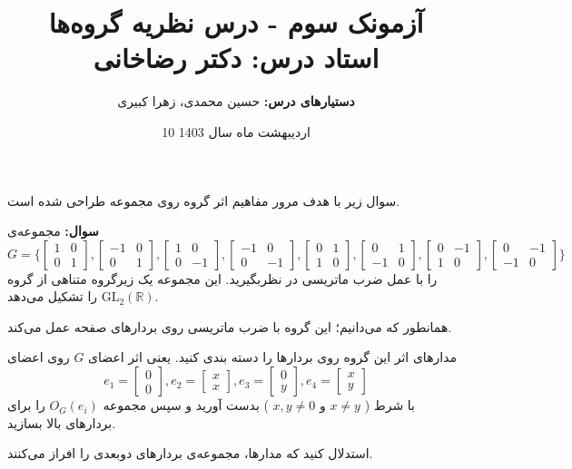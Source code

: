 \documentclass[12pt]{article}
\begin{document}
	
	
	\title{آزمونک سوم - درس نظریه‌ گروه‌ها
		\\
		{\normalsize 
			\textbf{استاد درس:}
			دکتر رضاخانی
		}
	}
	\author{
		\small
		\textbf{دستیارهای درس:}
		حسین محمدی، زهرا کبیری
	} 
	\date{10 اردیبهشت ماه سال 1403}
	\maketitle
	سوال زیر با هدف مرور مفاهیم اثر گروه روی مجموعه طراحی شده است.
	
	\vspace{1.5em}
	\noindent
	\textbf{ سوال:}
	مجموعه‌ی 
	\[
	G = \Biggl\{
	\begin{bmatrix}
		1&0 \\ 0&1
	\end{bmatrix},
	\begin{bmatrix}
		-1&0 \\ 0&1
	\end{bmatrix},
	\begin{bmatrix}
		1&0 \\ 0&-1
	\end{bmatrix},
	\begin{bmatrix}
		-1&0 \\ 0&-1
	\end{bmatrix},
	\begin{bmatrix}
		0&1 \\ 1&0
	\end{bmatrix},
	\begin{bmatrix}
		0&1 \\ -1&0
	\end{bmatrix},
	\begin{bmatrix}
		0&-1 \\ 1&0
	\end{bmatrix},
	\begin{bmatrix}
		0&-1 \\ -1&0
	\end{bmatrix}
	\Biggr\}
	\]
	را با عمل ضرب ماتریسی در نظربگیرید. این مجموعه یک زیرگروه متناهی از گروه
	$\text{GL}_2(\mathbb{R})$
	را تشکیل می‌دهد.
	
	\noindent
	همانطور که می‌دانیم؛ این گروه با ضرب ماتریسی روی بردارهای صفحه عمل می‌کند.
	
	\vspace{1.5em}
	\noindent
	مدارهای اثر این گروه روی بردارها را دسته بندی کنید. یعنی اثر اعضای $G$ روی اعضای
\[
e_1 = 	\begin{bmatrix}
		0 \\ 0
	\end{bmatrix},
e_2 = 	\begin{bmatrix}
		x \\ x
	\end{bmatrix},
	e_3 = \begin{bmatrix}
		0 \\ y
	\end{bmatrix},
e_4 = 	\begin{bmatrix}
		x \\ y
	\end{bmatrix}
\]
	با شرط
	(
	$x\neq y$ و $x,y\neq 0$
	)
	بدست آورید و سپس مجموعه
	$O_G(e_i)$
	را برای بردارهای بالا بسازید.
	
	\noindent
	استدلال کنید که مدارها، مجموعه‌ی بردارهای دوبعدی را افراز می‌کنند.
	
	
	
	
	
	
	
	
	
\end{document}
